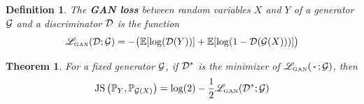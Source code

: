 \documentclass{article}
\newtheorem{defn}{Definition}
\newtheorem{theorem}{Theorem}
\begin{document}
	\newcommand{\lossgan}{\mathscr{L}_{\textnormal{\tiny GAN}}}
	\newcommand{\expect}{\mathbb{E}}
	\begin{defn}\label{def:loss_gan}
		The \textbf{GAN loss} between random variables \(X\) and \(Y\) of a generator \(\mathcal{G}\) and a discriminator \(\mathcal{D}\) is the function
		\begin{equation}\label{eq:loss_gan}
			\lossgan(\discriminator; \generator) = -\big(\expect[\log (\discriminator(Y))] + \expect[\log(1 - \discriminator(\generator(X)))]\big)
		\end{equation}
	\end{defn}	
	
	\newcommand{\blah}{\,\boldsymbol{\cdot}\,}
	\begin{theorem}\label{thm:discriminator_minimizes_JSD}
		For a fixed generator \(\mathcal{G}\), if \(\mathcal{D}^*\) is the minimizer of \(\lossgan(\blah; \generator)\), then
		\begin{equation*}
			\jsd\left(\prob_Y, \prob_{\generator(X)}\right) = \log(2) - \frac{1}{2}\lossgan(\discriminator^*; \generator)
		\end{equation*}
	\end{theorem} 
	
\end{document}
